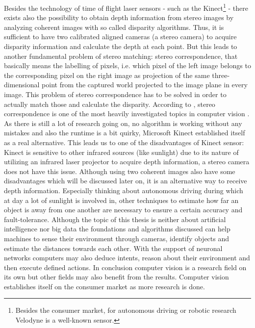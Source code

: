 \noindent Besides the technology of time of flight laser sensors - such as the Kinect\footnote{Besides the consumer market, for autonomous driving or robotic research Velodyne is a well-known sensor.} - there exists also the possibility to obtain depth information from stereo images by analyzing coherent images with so called disparity algorithms.
Thus, it is sufficient to have two calibrated aligned cameras (a stereo camera) to acquire disparity information and calculate the depth at each point.
But this leads to another fundamental problem of stereo matching: stereo correspondence, that basically means the labelling of pixels, i.e. which pixel of the left image belongs to the corresponding pixel on the right image as projection of the same three-dimensional point from the captured world projected to the image plane in every image.
This problem of stereo correspondence has to be solved in order to actually match those and calculate the disparity.
According to \citeauthor{scharstein2002taxonomy}, stereo correspondence is one of the most heavily investigated topics in computer vision \citep{scharstein2002taxonomy}.
As there is still a lot of research going on, no algorithm is working without any mistakes and also the runtime is a bit quirky, Microsoft Kinect established itself as a real alternative.
This leads us to one of the disadvantages of Kinect sensor: Kinect is sensitive to other infrared sources (like sunlight) due to its nature of utilizing an infrared laser projector to acquire depth information, a stereo camera does not have this issue.
Although using two coherent images also have some disadvantages which will be discussed later on, it is an alternative way to receive depth information.
Especially thinking about autonomous driving during which at day a lot of sunlight is involved in, other techniques to estimate how far an object is away from one another are necessary to ensure a certain accuracy and fault-tolerance.
\newline\newline\noindent Although the topic of this thesis is neither about artificial intelligence nor big data the foundations and algorithms discussed can help machines to sense their environment through cameras, identify objects and estimate the distances towards each other.
With the support of neuronal networks computers may also deduce intents, reason about their environment and then execute defined actions.
In conclusion computer vision is a research field on its own but other fields may also benefit from the results.
Computer vision establishes itself on the consumer market as more research is done.
